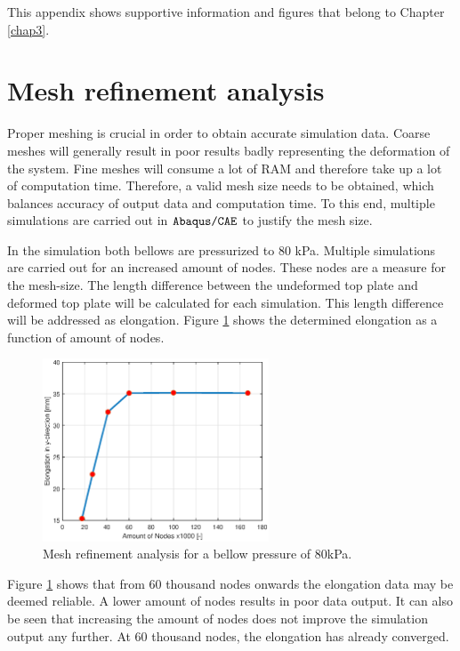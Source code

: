 \label{app:chap3}

This appendix shows supportive information and figures that belong to Chapter \ref{chap3}.



\section{Mesh refinement analysis}

Proper meshing is crucial in order to obtain accurate simulation data. Coarse meshes will generally result in poor results badly representing the deformation of the system. Fine meshes will consume a lot of RAM and therefore take up a lot of computation time. Therefore, a valid mesh size needs to be obtained, which balances accuracy of output data and computation time. To this end, multiple simulations are carried out in $\verb+Abaqus/CAE+$ to justify the mesh size.

In the simulation both bellows are pressurized to $80$ kPa. Multiple simulations are carried out for an increased amount of nodes. These nodes are a measure for the mesh-size. The length difference between the undeformed top plate and deformed top plate will be calculated for each simulation. This length difference will be addressed as elongation. Figure \ref{fig3:meshrefinement} shows the determined elongation as a function of amount of nodes.

\begin{figure}[H]
    \centering
    \includegraphics[width = 0.6\textwidth]{Figures/Chapter2/MeshRefinement.eps}
    \caption{Mesh refinement analysis for a bellow pressure of $80$kPa.}
    \label{fig3:meshrefinement}
\end{figure}


Figure \ref{fig3:meshrefinement} shows that from 60 thousand nodes onwards the elongation data may be deemed reliable. A lower amount of nodes results in poor data output. It can also be seen that increasing the amount of nodes does not improve the simulation output any further. At 60 thousand nodes, the elongation has already converged.



